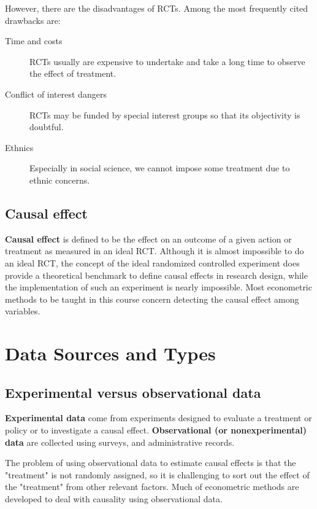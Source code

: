 \documentclass[a4paper,11pt]{article}
\begin{document}
However, there are the disadvantages of RCTs. Among the most
frequently cited drawbacks are:
\begin{description}
\item[{Time and costs}] RCTs usually are expensive to undertake and take a
long time to observe the effect of treatment.
\item[{Conflict of interest dangers}] RCTs may be funded by special interest
groups so that its objectivity is doubtful.
\item[{Ethnics}] Especially in social science, we cannot impose some
treatment due to ethnic concerns.
\end{description}


\subsection*{Causal effect}
\label{sec:org9df9ca4}

\textbf{Causal effect} is defined to be the effect on an outcome of a given
action or treatment as measured in an ideal RCT. Although it is almost
impossible to do an ideal RCT, the concept of the ideal randomized
controlled experiment does provide a theoretical benchmark to define
causal effects in research design, while the implementation of such an
experiment is nearly impossible. Most econometric methods to be taught
in this course concern detecting the causal effect among variables. 


\section{Data Sources and Types}
\label{sec:orgdb98e7d}

\subsection*{Experimental versus observational data}
\label{sec:org0c1088c}

\textbf{Experimental data} come from experiments designed to evaluate a
treatment or policy or to investigate a causal effect. \textbf{Observational
(or nonexperimental) data} are collected using surveys, and
administrative records.

The problem of using observational data to estimate causal effects is
that the "treatment" is not randomly assigned, so it is challenging to
sort out the effect of the "treatment" from other relevant
factors. Much of econometric methods are developed to deal with
causality using observational data.
\end{document}
